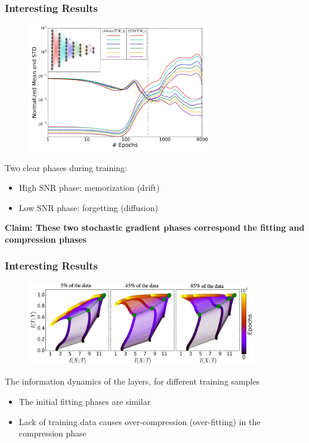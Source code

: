 \documentclass[notes]{beamer}
\begin{document}
\begin{frame}
    \frametitle{Interesting Results}
    \vspace{-0.25cm}
    \begin{figure}
        \centering
        \includegraphics[width=8cm]{mean_std.jpg}
    \end{figure}
    \vspace{-0.4cm}
    Two clear phases during training: 
    \begin{itemize}
        \item High SNR phase: memorization (drift)
        \item Low SNR phase: forgetting (diffusion)
    \end{itemize}
    \textbf{Claim: These two stochastic gradient phases correspond the fitting and compression phases}
\end{frame}

\begin{frame}
    \frametitle{Interesting Results}
    \begin{figure}
        \centering
        \includegraphics[width=10cm]{info_plane_data.jpg}
    \end{figure}
    The information dynamics of the layers, for different training samples
    \begin{itemize}
        \item The initial fitting phases are similar
        \item Lack of training data causes over-compression (over-fitting) in the compression phase
    \end{itemize}
\end{frame}
\end{document}
